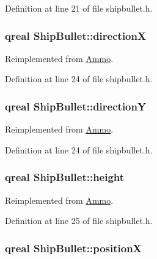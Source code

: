 Definition at line 21 of file shipbullet.h.\hypertarget{class_ship_bullet_a5f2086fa76ca48a99e7b6b53592b9ab0}{
\subsubsection[{directionX}]{\setlength{\rightskip}{0pt plus 5cm}qreal {\bf ShipBullet::directionX}}}
\label{class_ship_bullet_a5f2086fa76ca48a99e7b6b53592b9ab0}


Reimplemented from \hyperlink{class_ammo_a60392d67523d0cf6d46e14b6b3f1ae05}{Ammo}.

Definition at line 24 of file shipbullet.h.\hypertarget{class_ship_bullet_a091f76850ba260f2a306d5dc7e69bd1b}{
\subsubsection[{directionY}]{\setlength{\rightskip}{0pt plus 5cm}qreal {\bf ShipBullet::directionY}}}
\label{class_ship_bullet_a091f76850ba260f2a306d5dc7e69bd1b}


Reimplemented from \hyperlink{class_ammo_a1156ff1439690bf121841528585aa026}{Ammo}.

Definition at line 24 of file shipbullet.h.\hypertarget{class_ship_bullet_a481df890ebe98e14a9fed36020a5e265}{
\subsubsection[{height}]{\setlength{\rightskip}{0pt plus 5cm}qreal {\bf ShipBullet::height}}}
\label{class_ship_bullet_a481df890ebe98e14a9fed36020a5e265}


Reimplemented from \hyperlink{class_ammo_a7ee07e5c3778fe15aeef8126a5251e3b}{Ammo}.

Definition at line 25 of file shipbullet.h.\hypertarget{class_ship_bullet_a24067ecee3430c3094aeee3a5de4740b}{
\subsubsection[{positionX}]{\setlength{\rightskip}{0pt plus 5cm}qreal {\bf ShipBullet::positionX}}}
\label{class_ship_bullet_a24067ecee3430c3094aeee3a5de4740b}


